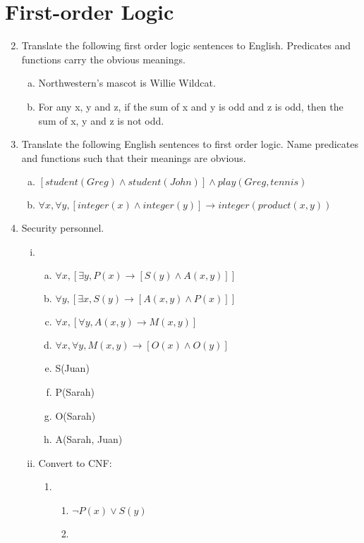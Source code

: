 \documentclass{article}
\theoremstyle{quest}
\begin{document}
\section*{First-order Logic}
\begin{enumerate}
\setcounter{enumi}{1}
\item
Translate the following first order logic 
sentences to English. Predicates and functions carry the obvious 
meanings. 
\begin{enumerate}[a.]
\item
Northwestern's mascot is Willie Wildcat.
\item
For any x, y and z, if the sum of x and y is odd and z is odd, then the sum of x, y and z is not odd.
\end{enumerate}
\item
Translate the following English sentences to 
first order logic. Name predicates and functions such that their 
meanings are obvious. 
\begin{enumerate}[a.]
\item
$[student(Greg) \land student(John)]\land play(Greg, tennis)$
\item
$\forall x, \forall y, [integer(x) \land integer(y)] \rightarrow integer(product(x, y))$
\end{enumerate}
\item
Security personnel.
\begin{enumerate}[(i)]
\item
\begin{enumerate}[a.]
\item
$\forall x, [\exists y, P(x) \rightarrow [S(y) \land A(x,y)]]$
\item
$\forall y, [\exists x, S(y) \rightarrow [A(x, y) \land P(x)]]$
\item
$\forall x, [\forall y, A(x,y) \rightarrow M(x,y)]$
\item
$\forall x, \forall y, M(x,y) \rightarrow [O(x) \land O(y)]$
\item
S(Juan)
\item
P(Sarah)
\item
O(Sarah)
\item
A(Sarah, Juan)
\end{enumerate}
\item
Convert to CNF:
\begin{enumerate}[A]
\item
\begin{enumerate}[1]
\item
$\lnot P(x) \lor S(y)$
\item

\end{enumerate}
\end{enumerate}
\end{enumerate}
\end{enumerate}
\end{document}
